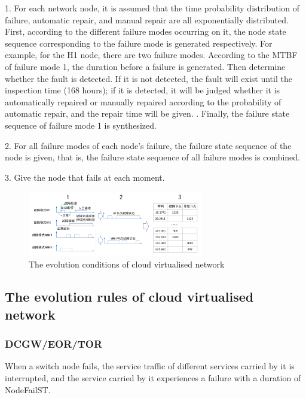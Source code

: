 \documentclass[journal]{IEEEtran}
\begin{document}
    1. For each network node, it is assumed that the time probability distribution of failure, automatic repair, and manual repair are all exponentially distributed. First, according to the different failure modes occurring on it, the node state sequence corresponding to the failure mode is generated respectively. For example, for the H1 node, there are two failure modes. According to the MTBF of failure mode 1, the duration before a failure is generated. Then determine whether the fault is detected. If it is not detected, the fault will exist until the inspection time (168 hours); if it is detected, it will be judged whether it is automatically repaired or manually repaired according to the probability of automatic repair, and the repair time will be given. . Finally, the failure state sequence of failure mode 1 is synthesized.

    2. For all failure modes of each node's failure, the failure state sequence of the node is given, that is, the failure state sequence of all failure modes is combined.

    3. Give the node that fails at each moment.

    \begin{figure}[!t]
        \begin{center}
            \includegraphics[width = 3in]{img/3.eps}
            \caption{The evolution conditions of cloud virtualised network}
            \label{fig3}
        \end{center}
    \end{figure}

    \subsection{The evolution rules of cloud virtualised network}

    \subsubsection{DCGW/EOR/TOR}
    When a switch node fails, the service traffic of different services carried by it is interrupted, and the service carried by it experiences a failure with a duration of NodeFailST.
\end{document}
